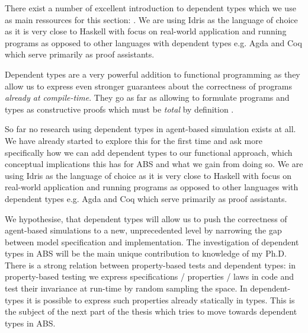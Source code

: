 There exist a number of excellent introduction to dependent types which we use as main ressources for this section: \cite{thompson_type_1991, program_homotopy_2013, stump_verified_2016, brady_type-driven_2017, pierce_programming_2018}. We are using Idris \cite{brady_idris_2013} as the language of choice as it is very close to Haskell with focus on real-world application and running programs as opposed to other languages with dependent types e.g. Agda and Coq which serve primarily as proof assistants.

Dependent types are a very powerful addition to functional programming as they allow us to express even stronger guarantees about the correctness of programs \textit{already at compile-time}. They go as far as allowing to formulate programs and types as constructive proofs which must be \textit{total} by definition \cite{thompson_type_1991, mckinna_why_2006, altenkirch_pi_2010}. 

So far no research using dependent types in agent-based simulation exists at all. We have already started to explore this for the first time and ask more specifically how we can add dependent types to our functional approach, which conceptual implications this has for ABS and what we gain from doing so. We are using Idris \cite{brady_idris_2013} as the language of choice as it is very close to Haskell with focus on real-world application and running programs as opposed to other languages with dependent types e.g. Agda and Coq which serve primarily as proof assistants.

We hypothesise, that  dependent types will allow us to push the correctness of agent-based simulations to a new, unprecedented level by narrowing the gap between model specification and implementation. The investigation of dependent types in ABS will be the main unique contribution to knowledge of my Ph.D.\\

There is a strong relation between property-based tests and dependent types: in property-based testing we express specifications / properties / laws in code and test their invariance at run-time by random sampling the space. In dependent-types it is possible to express such properties already statically in types. This is the subject of the next part of the thesis which tries to move towards dependent types in ABS.




